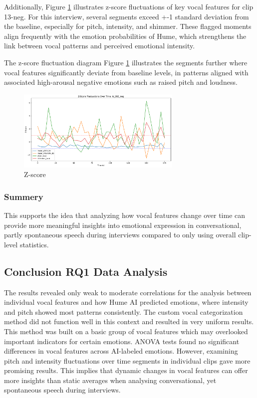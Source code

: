 Additionally, Figure \ref{fig:z-score-15} illustrates z-score fluctuations of key vocal features for clip 13-neg. For this interview, several segments exceed +-1 standard deviation from the baseline, especially for pitch, intensity, and shimmer. These flagged moments align frequently with the emotion probabilities of Hume, which strengthens the link between vocal patterns and perceived emotional intensity. 

The z-score fluctuation diagram Figure \ref{fig:z-score-15} illustrates the segments further where vocal features significantly deviate from baseline levels, in patterns aligned with associated high-arousal negative emotions such as raised pitch and loudness. 

\begin{figure}[H]
    \centering 
    \includegraphics[width=0.7\textwidth]{png/results/rq1/zscore_fluctuations_id_015_neg.pdf}
    \caption{Z-score}
    \label{fig:z-score-15}
\end{figure}

\subsubsection{Summery}
This supports the idea that analyzing how vocal features change over time  can provide more meaningful insights into emotional expression in conversational, partly spontaneous speech during interviews compared to only using overall clip-level statistics.

\subsection{Conclusion RQ1 Data Analysis}
The results revealed only weak to moderate correlations for the analysis between individual vocal features and how Hume AI predicted emotions, where intensity and pitch showed most patterns consistently. 
The custom vocal categorization method did not function well in this context and resulted in very uniform results. This method was built on a basic group of vocal features which may overlooked important indicators for certain emotions. 
ANOVA tests found no significant differences in vocal features across AI-labeled emotions. However, examining pitch and intensity fluctuations over time segments in individual clips gave more promising results. This implies that dynamic changes in vocal features 
can offer more insights than static averages when analysing conversational, yet spontaneous speech during interviews. 

